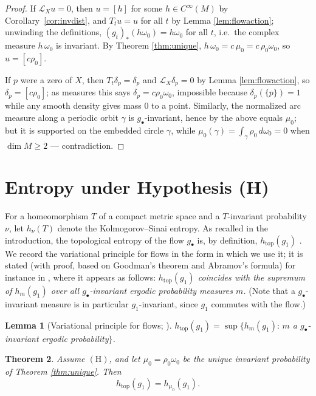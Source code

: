 \documentclass[11pt]{amsart}
\theoremstyle{plain}
\newtheorem{theorem}{Theorem}[section]
\newtheorem{lemma}[theorem]{Lemma}
\theoremstyle{definition}
\theoremstyle{remark}
\newcommand{\Lx}{\mathcal{L}_X}
\begin{document}
\begin{proof}
If $\Lx u=0$, then $u=[h]$ for some $h\in C^\infty(M)$ by
Corollary~\ref{cor:invdist}, and $T_tu=u$ for all $t$ by Lemma
\ref{lem:flowaction}; unwinding the definitions,
$(g_t)_*(h\omega_0)=h\omega_0$ for all $t$, i.e.\ the complex measure
$h\,\omega_0$ is invariant. By Theorem \ref{thm:unique},
$h\,\omega_0=c\,\mu_0=c\,\rho_0\omega_0$, so $u=[c\rho_0]$.

If $p$ were a zero of $X$, then $T_t\delta_p=\delta_p$ and
$\Lx\delta_p=0$ by Lemma \ref{lem:flowaction}, so
$\delta_p=[c\rho_0]$; as measures this says $\delta_p=c\rho_0\omega_0$,
impossible because $\delta_p(\{p\})=1$ while any smooth density gives
mass $0$ to a point. Similarly, the normalized arc measure along a
periodic orbit $\gamma$ is $g_\bullet$-invariant, hence by the above
equals $\mu_0$; but it is supported on the embedded circle $\gamma$,
while $\mu_0(\gamma)=\int_\gamma\rho_0\,d\omega_0=0$ when
$\dim M\ge2$ --- contradiction.
\end{proof}

\section{Entropy under Hypothesis (H)}\label{sec:entropy}

For a homeomorphism $T$ of a compact metric space and a $T$-invariant
probability $\nu$, let $h_\nu(T)$ denote the Kolmogorov--Sinai entropy.
As recalled in the introduction, the topological entropy of the flow
$g_\bullet$ is, by definition, $h_{\mathrm{top}}(g_1)$ \cite{LWW}. We
record the variational principle for flows in the form in which we use
it; it is stated (with proof, based on Goodman's theorem \cite{Good} and
Abramov's formula) for instance in \cite{LWW}, where it appears as
follows: \emph{$h_{\mathrm{top}}(g_1)$ coincides with the supremum of
$h_m(g_1)$ over all $g_\bullet$-invariant ergodic probability measures
$m$.} (Note that a $g_\bullet$-invariant measure is in particular
$g_1$-invariant, since $g_1$ commutes with the flow.)

\begin{lemma}[Variational principle for flows; \cite{Good,LWW}]\label{lem:VP}
$h_{\mathrm{top}}(g_1)=\sup\{h_m(g_1):\, m$ a $g_\bullet$-invariant
ergodic probability$\}$.
\end{lemma}

\begin{theorem}\label{thm:entropy}
Assume $(\mathrm{H})$, and let $\mu_0=\rho_0\omega_0$ be the unique
invariant probability of Theorem \emph{\ref{thm:unique}}. Then
\[
h_{\mathrm{top}}(g_1)=h_{\mu_0}(g_1).
\]
\end{theorem}
\end{document}
